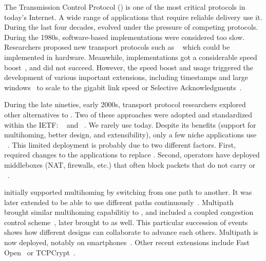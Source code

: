 The Transmission Control Protocol (\tcp) \cite{rfc793} is one of the most critical protocols in today's Internet. A wide range of applications that require reliable delivery use it. During the last four decades, \tcp evolved under the pressure of competing protocols. During the 1980s, software-based \tcp implementations were considered too slow. Researchers proposed new transport protocols such as \xtp~\cite{sanders1990xpress} which could be implemented in hardware. Meanwhile, \tcp implementations got a considerable speed boost~\cite{clark1989analysis}, and \xtp did not succeed.  However,
the \tcp speed boost and usage triggered the development of various important \tcp extensions, including timestamps and large windows~\cite{rfc1323} to scale to the gigabit link speed or Selective Acknowledgments~\cite{rfc2018}.

During the late nineties, early 2000s, transport protocol researchers
explored other alternatives to \tcp. Two of these approaches were adopted
and standardized within the IETF: \dccp~\cite{kohler2006designing} and
\sctp~\cite{rfc4960}. We rarely use \dccp today. Despite its benefits
(support for multihoming, better design, and extensibility), only a few niche
applications use \sctp~\cite{budzisz2012taxonomy}. This limited deployment is probably due to two different factors. First, \sctp required changes to the applications to replace \tcp. Second, operators have deployed middleboxes (NAT, firewalls, etc.) that often block packets that do not carry \tcp or \udp~\cite{honda2011still}.

\sctp initially supported multihoming by switching from one path to another. It
was later extended to be able to use different paths continuously~\cite{iyengar2006concurrent}.  Multipath \tcp~\cite{rfc6824,raiciu2012hard} brought similar multihoming capabilitiy to \tcp, and included a coupled congestion control scheme~\cite{wischik2011design}, later brought to \sctp as well. This particular
succession of events shows how different designs can collaborate to advance each others.  Multipath \tcp is now deployed, notably on
smartphones~\cite{bonaventure2016multipath}. Other recent \tcp extensions include \tcp Fast Open~\cite{rfc7413} or TCPCrypt~\cite{rfc8548}.


